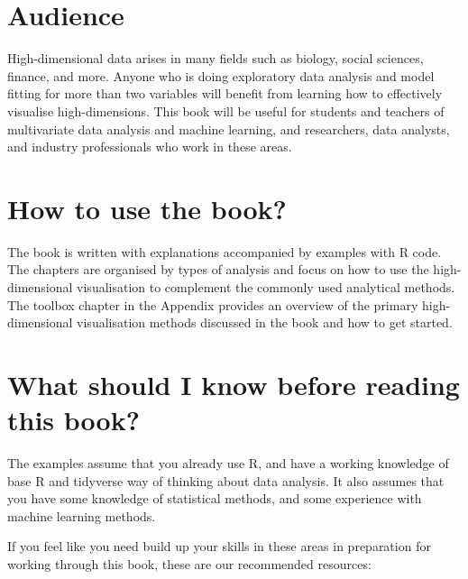 \documentclass[
  letterpaper,
]{krantz}
\begin{document}
\hypertarget{audience}{%
\section*{Audience}\label{audience}}


High-dimensional data arises in many fields such as biology, social
sciences, finance, and more. Anyone who is doing exploratory data
analysis and model fitting for more than two variables will benefit from
learning how to effectively visualise high-dimensions. This book will be
useful for students and teachers of multivariate data analysis and
machine learning, and researchers, data analysts, and industry
professionals who work in these areas.

\hypertarget{how-to-use-the-book}{%
\section*{How to use the book?}\label{how-to-use-the-book}}


The book is written with explanations accompanied by examples with R
code. The chapters are organised by types of analysis and focus on how
to use the high-dimensional visualisation to complement the commonly
used analytical methods. The toolbox chapter in the Appendix provides an
overview of the primary high-dimensional visualisation methods discussed
in the book and how to get started.

\hypertarget{what-should-i-know-before-reading-this-book}{%
\section*{What should I know before reading this
book?}\label{what-should-i-know-before-reading-this-book}}


The examples assume that you already use R, and have a working knowledge
of base R and tidyverse way of thinking about data analysis. It also
assumes that you have some knowledge of statistical methods, and some
experience with machine learning methods.

If you feel like you need build up your skills in these areas in
preparation for working through this book, these are our recommended
resources:
\end{document}
